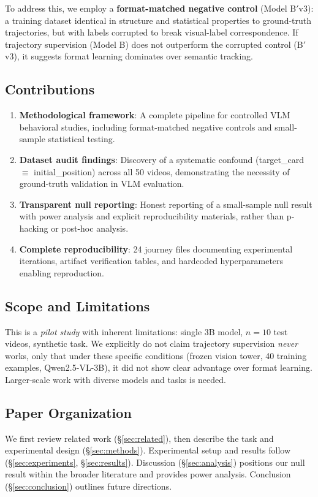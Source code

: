 To address this, we employ a \textbf{format-matched negative control} (Model B$'$v3): a training dataset identical in structure and statistical properties to ground-truth trajectories, but with labels corrupted to break visual-label correspondence. If trajectory supervision (Model B) does not outperform the corrupted control (B$'$v3), it suggests format learning dominates over semantic tracking.

\subsection{Contributions}

\begin{enumerate}
    \item \textbf{Methodological framework}: A complete pipeline for controlled VLM behavioral studies, including format-matched negative controls and small-sample statistical testing.
    
    \item \textbf{Dataset audit findings}: Discovery of a systematic confound (target\_card $\equiv$ initial\_position) across all 50 videos, demonstrating the necessity of ground-truth validation in VLM evaluation.
    
    \item \textbf{Transparent null reporting}: Honest reporting of a small-sample null result with power analysis and explicit reproducibility materials, rather than p-hacking or post-hoc analysis.
    
    \item \textbf{Complete reproducibility}: 24 journey files documenting experimental iterations, artifact verification tables, and hardcoded hyperparameters enabling reproduction.
\end{enumerate}

\subsection{Scope and Limitations}

This is a \emph{pilot study} with inherent limitations: single 3B model, $n=10$ test videos, synthetic task. We explicitly do not claim trajectory supervision \emph{never} works, only that under these specific conditions (frozen vision tower, 40 training examples, Qwen2.5-VL-3B), it did not show clear advantage over format learning. Larger-scale work with diverse models and tasks is needed.

\subsection{Paper Organization}

We first review related work (\S\ref{sec:related}), then describe the task and experimental design (\S\ref{sec:methods}). Experimental setup and results follow (\S\ref{sec:experiments}, \S\ref{sec:results}). Discussion (\S\ref{sec:analysis}) positions our null result within the broader literature and provides power analysis. Conclusion (\S\ref{sec:conclusion}) outlines future directions.
